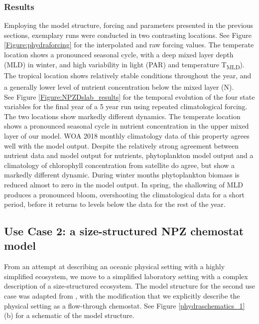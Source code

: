 \documentclass[template.tex]{subfiles}
\begin{document}
\subsubsection{Results}
Employing the model structure, forcing and parameters presented in the previous sections, exemplary runs were conducted in two contrasting locations. 
See Figure \ref{Figure:phydraforcing} for the interpolated and raw forcing values. The temperate location shows a pronounced seasonal cycle, with a deep mixed layer depth (MLD) in winter, and high variability in light (PAR) and temperature \unit{T_{MLD}}). The tropical location shows relatively stable conditions throughout the year, and a generally lower level of nutrient concentration below the mixed layer (\unit{N^\emptyset}).\\

See Figure \ref{Figure:NPZDslab_results} for the temporal evolution of the four state variables for the final year of a 5 year run using repeated climatological forcing. 
The two locations show markedly different dynamics. The temperate location shows a pronounced seasonal cycle in nutrient concentration in the upper mixed layer of our model. WOA 2018 monthly climatology data of this property agrees well with the model output. Despite the relatively strong agreement between nutrient data and model output for nutrients, phytoplankton model output and a climatology of chlorophyll concentration from satellite do agree, but show a markedly different dynamic. During winter months phytoplankton biomass is reduced almost to zero in the model output. In spring, the shallowing of MLD produces a pronounced bloom, overshooting the climatological data for a short period, before it returns to levels below the data for the rest of the year. 





\subsection{Use Case 2: a size-structured NPZ chemostat model}
From an attempt at describing an oceanic physical setting with a highly simplified ecosystem, we move to a simplified laboratory setting with a complex description of a size-structured ecosystem. The model structure for the second use case was adapted from \cite{Banas2011b}, with the modification that we explicitly describe the physical setting as a flow-through chemostat. See Figure \ref{phydraschematics_1} (b) for a schematic of the model structure. \\
\end{document}
